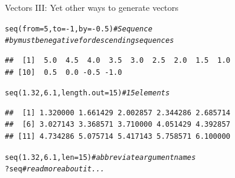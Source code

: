 \documentclass[xcolor=table,           xcolor=dvipsnames]{beamer}\usepackage[]{graphicx}\usepackage[]{color}
\makeatletter
\newcommand{\hlnum}[1]{\textcolor[rgb]{0,0,0}{#1}}
\newcommand{\hlcom}[1]{\textcolor[rgb]{0,0.392,0}{\textit{#1}}}
\newcommand{\hlopt}[1]{\textcolor[rgb]{0,0,0}{#1}}
\newcommand{\hlstd}[1]{\textcolor[rgb]{0,0,0}{#1}}
\newcommand{\hlkwc}[1]{\textcolor[rgb]{1,0,1}{#1}}
\newcommand{\hlkwd}[1]{\textcolor[rgb]{0,0,1}{#1}}
\newenvironment{kframe}{%
 \def\at@end@of@kframe{}%
 \ifinner\ifhmode%
  \def\at@end@of@kframe{\end{minipage}}%
  \begin{minipage}{\columnwidth}%
 \fi\fi%
 \def\FrameCommand##1{\hskip\@totalleftmargin \hskip-\fboxsep
 \colorbox{shadecolor}{##1}\hskip-\fboxsep
     \hskip-\linewidth \hskip-\@totalleftmargin \hskip\columnwidth}%
 \MakeFramed {\advance\hsize-\width
   \@totalleftmargin\z@ \linewidth\hsize
   \@setminipage}}%
 {\par\unskip\endMakeFramed%
 \at@end@of@kframe}
\newenvironment{knitrout}{}{} %
\makeatother
\begin{document}
\begin{frame}[fragile]{Vectors III: Yet other ways to generate vectors}
\pause
\begin{knitrout}
\color{fgcolor}\begin{kframe}
\begin{alltt}
\hlkwd{seq}\hlstd{(}\hlkwc{from}\hlstd{=}\hlnum{5}\hlstd{,} \hlkwc{to}\hlstd{=}\hlopt{-}\hlnum{1}\hlstd{,} \hlkwc{by}\hlstd{=}\hlopt{-}\hlnum{0.5}\hlstd{)} \hlcom{# Sequence}
\hlcom{# by must be negative for descending sequences}
\end{alltt}
\begin{verbatim}
##  [1]  5.0  4.5  4.0  3.5  3.0  2.5  2.0  1.5  1.0
## [10]  0.5  0.0 -0.5 -1.0
\end{verbatim}
\end{kframe}
\end{knitrout}
\begin{knitrout}
\color{fgcolor}\begin{kframe}
\begin{alltt}
\hlkwd{seq}\hlstd{(}\hlnum{1.32}\hlstd{,} \hlnum{6.1}\hlstd{,} \hlkwc{length.out}\hlstd{=}\hlnum{15}\hlstd{)} \hlcom{# 15 elements}
\end{alltt}
\begin{verbatim}
##  [1] 1.320000 1.661429 2.002857 2.344286 2.685714
##  [6] 3.027143 3.368571 3.710000 4.051429 4.392857
## [11] 4.734286 5.075714 5.417143 5.758571 6.100000
\end{verbatim}
\end{kframe}
\end{knitrout}
\begin{knitrout}
\color{fgcolor}\begin{kframe}
\begin{alltt}
\hlkwd{seq}\hlstd{(}\hlnum{1.32}\hlstd{,} \hlnum{6.1}\hlstd{,} \hlkwc{len}\hlstd{=}\hlnum{15}\hlstd{)} \hlcom{# abbreviate argument names}
\hlopt{?}\hlstd{seq} \hlcom{# read more about it...}
\end{alltt}
\end{kframe}
\end{knitrout}
\end{frame}

\end{document}
